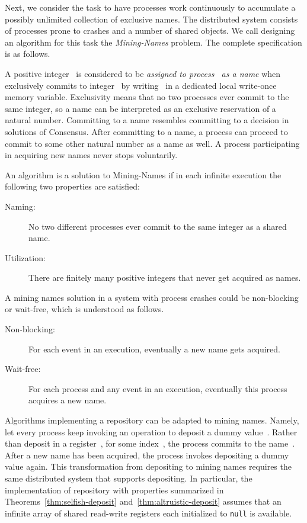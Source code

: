 \documentclass[11pt]{article}
\begin{document}
Next, we consider the task to have processes work continuously to accumulate a possibly  unlimited collection of exclusive names.
The distributed system consists of  processes prone to crashes and a number of shared objects.
We call designing an algorithm for this task the \emph{Mining-Names} problem.
The complete specification is as follows.

A positive integer~ is considered to be \emph{assigned to process~ as a name} when  exclusively commits to integer~ by writing~  in a dedicated local write-once memory variable.
Exclusivity means that no two processes ever commit to the same integer, so a name can be interpreted as an exclusive reservation of a natural number.
Committing to a name resembles committing to a decision in solutions of Consensus.
After committing to a name, a process can proceed to commit to some other natural number as a name as well.
A process participating in acquiring new names never stops voluntarily.

An algorithm is a solution to Mining-Names if in each infinite execution the following two properties are satisfied:
\begin{description}
\item[\sf Naming:] 
No two different processes ever commit to the same integer as a shared name.

\item[\sf Utilization:] 
There are finitely many positive integers that never get acquired as names.
\end{description}
A mining names solution in a system with process crashes could be non-blocking or wait-free, which is understood as follows.
\begin{description}
\item[\sf Non-blocking:] 
For each  event in an execution, eventually a new name gets acquired.
\item[\sf Wait-free:] 
For each  process and any event in an execution, eventually this process acquires a new name.
\end{description}

Algorithms implementing a repository can be adapted to mining names. 
Namely, let every process keep invoking an operation to deposit a dummy value~.
Rather than deposit  in a register~, for some index~, the process commits to the name~.
After a new name has been acquired, the process invokes depositing a dummy value again.
This transformation from depositing to mining names requires the same distributed system that supports depositing.
In particular, the implementation of repository with properties summarized in Theorems~\ref{thm:selfish-deposit} and~\ref{thm:altruistic-deposit} assumes that an infinite array of shared read-write registers each initialized to \texttt{null} is available.
\end{document}
